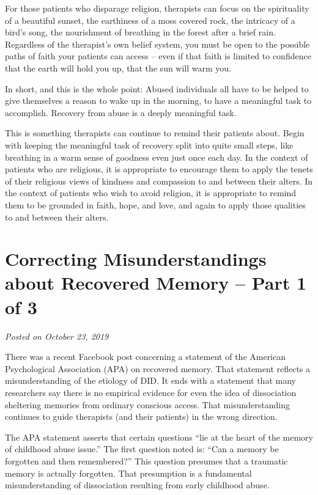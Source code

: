\documentclass[]{book}
\begin{document}
For those patients who disparage religion, therapists can focus on the spirituality of a beautiful sunset, the earthiness of a moss covered rock, the intricacy of a bird's song, the nourishment of breathing in the forest after a brief rain. Regardless of the therapist's own belief system, you must be open to the possible paths of faith your patients can access -- even if that faith is limited to confidence that the earth will hold you up, that the sun will warm you.

In short, and this is the whole point: Abused individuals all have to be helped to give themselves a reason to wake up in the morning, to have a meaningful task to accomplish. Recovery from abuse is a deeply meaningful task.

This is something therapists can continue to remind their patients about. Begin with keeping the meaningful task of recovery split into quite small steps, like breathing in a warm sense of goodness even just once each day. In the context of patients who are religious, it is appropriate to encourage them to apply the tenets of their religious views of kindness and compassion to and between their alters. In the context of patients who wish to avoid religion, it is appropriate to remind them to be grounded in faith, hope, and love, and again to apply those qualities to and between their alters.

\hypertarget{correcting-misunderstandings-about-recovered-memory-part-1-of-3}{%
\section{Correcting Misunderstandings about Recovered Memory -- Part 1 of 3}\label{correcting-misunderstandings-about-recovered-memory-part-1-of-3}}

\emph{Posted on October 23, 2019}

There was a recent Facebook post concerning a statement of the American Psychological Association (APA) on recovered memory. That statement reflects a misunderstanding of the etiology of DID. It ends with a statement that many researchers say there is no empirical evidence for even the idea of dissociation sheltering memories from ordinary conscious access. That misunderstanding continues to guide therapists (and their patients) in the wrong direction.

The APA statement asserts that certain questions ``lie at the heart of the memory of childhood abuse issue.'' The first question noted is: ``Can a memory be forgotten and then remembered?'' This question presumes that a traumatic memory is actually forgotten. That presumption is a fundamental misunderstanding of dissociation resulting from early childhood abuse.
\end{document}

